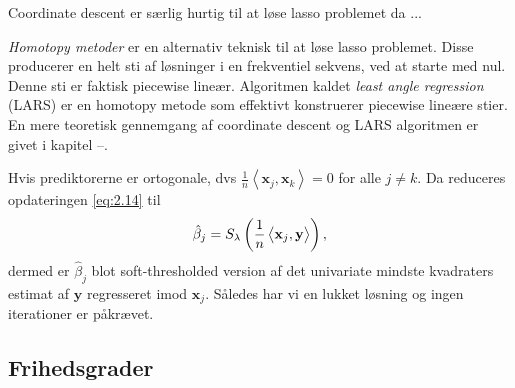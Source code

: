 Coordinate descent er særlig hurtig til at løse lasso problemet da ...

\textit{Homotopy metoder} er en alternativ teknisk til at løse lasso problemet. Disse producerer en helt sti af løsninger i en frekventiel sekvens, ved at starte med nul.
Denne sti er faktisk piecewise lineær.
Algoritmen kaldet \textit{least angle regression} (LARS) er en homotopy metode som effektivt konstruerer piecewise lineære stier.
En mere teoretisk gennemgang af coordinate descent og LARS algoritmen er givet i kapitel --. 


Hvis prediktorerne er ortogonale, dvs $\frac{1}{n} \left\langle \mathbf{x}_j, \mathbf{x}_k \right\rangle = 0$ for alle $j \neq k$.
Da reduceres opdateringen \eqref{eq:2.14} til
\begin{align*}
\hat{\beta}_j = S_\lambda \del{\frac{1}{n} \left\langle \mathbf{x}_j, \mathbf{y} \right\rangle},
\end{align*}
dermed er $\hat{\beta}_j$ blot soft-thresholded version af det univariate mindste kvadraters estimat af $\mathbf{y}$ regresseret imod $\mathbf{x}_j$. Således har vi en lukket løsning og ingen iterationer er påkrævet.

\subsection{Frihedsgrader}
 